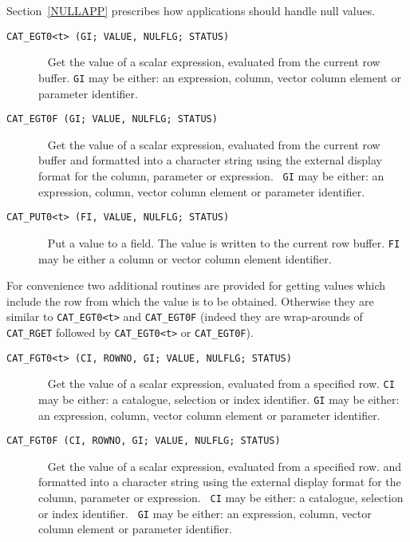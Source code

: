Section~\ref{NULLAPP} prescribes how applications should handle null
values.

\begin{description}

  \item[ {\tt CAT\_EGT0<t> (GI; VALUE, NULFLG; STATUS) } ] ~
  \newline Get the value of a scalar expression, evaluated from the 
   current row buffer. {\tt GI} may be either: an expression, column,
   vector column element or parameter identifier.

  \item[ {\tt CAT\_EGT0F (GI; VALUE, NULFLG; STATUS) } ] ~
  \newline Get the value of a scalar expression, evaluated from the 
   current row buffer and formatted into a character string using the
   external display format for the column, parameter or expression. {\tt
   GI} may be either: an expression, column, vector column element or 
   parameter identifier.

  \item[ {\tt CAT\_PUT0<t> (FI, VALUE, NULFLG; STATUS) } ] ~
  \newline Put a value to a field. The value is written to the current 
   row buffer. {\tt FI} may be either a column or vector column element
   identifier.

\end{description}

For convenience two additional routines are provided for getting
values which include the row from which the value is to be obtained.
Otherwise they are similar to {\tt CAT\_EGT0<t>} and {\tt CAT\_EGT0F}
(indeed they are wrap-arounds of {\tt CAT\_RGET} followed by
{\tt CAT\_EGT0<t>} or {\tt CAT\_EGT0F}).

\begin{description}

  \item[ {\tt CAT\_FGT0<t> (CI, ROWNO, GI; VALUE, NULFLG; STATUS) } ] ~
  \newline Get the value of a scalar expression, evaluated from a
   specified row. {\tt CI} may be either: a catalogue, selection or
   index identifier. {\tt GI} may be either: an expression, column,
   vector column element or parameter identifier.

  \item[ {\tt CAT\_FGT0F (CI, ROWNO, GI; VALUE, NULFLG; STATUS) } ] ~
  \newline Get the value of a scalar expression, evaluated from a
   specified row. and formatted into a character string using the
   external display format for the column, parameter or expression. {\tt 
   CI} may be either: a catalogue, selection or index identifier. {\tt
   GI} may be either: an expression, column, vector column element or 
   parameter identifier.

\end{description}

